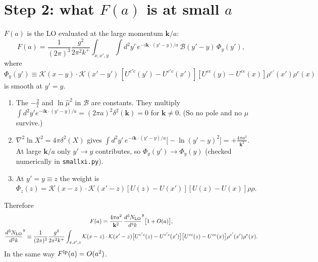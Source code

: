 \documentclass[10pt]{article}
\numberwithin{equation}{section}
\newcommand{\NLO}[1]{\frac{d^3N_{#1}}{d^3k}}
\begin{document}
\section{Step 2: what $F(a)$ is at small $a$}
$F(a)$ is the LO evaluated at the large momentum $\mathbf k/a$:
\begin{equation}
F(a)=\frac{1}{(2\pi)^3}\frac{g^2}{2\pi^2k^+}\int_{x,x',y}\int d^2y'\,e^{-i\mathbf k\cdot(y'-y)/a}\,\mathcal B(y'-y)\,\Phi_y(y'),
\end{equation}
where $\Phi_y(y')\equiv\mathcal K(x-y)\cdot\mathcal K(x'-y')\,[U^{e'c}(y')-U^{e'c}(x')][U^{ec}(y)-U^{ce}(x)]\rho^{e'}(x')\rho^e(x)$ is smooth at $y'=y$.
\begin{enumerate}
\item The $-\frac2\epsilon$ and $\ln\hat\mu^2$ in $\mathcal B$ are constants. They multiply $\int d^2y'e^{-i\mathbf k\cdot(y'-y)/a}=(2\pi a)^2\delta^2(\mathbf k)=0$ for $\mathbf k\ne0$. (So no pole and no $\mu$ survive.)
\item $\nabla^2\ln X^2=4\pi\delta^2(X)$ gives $\int d^2y'\,e^{-i\mathbf k\cdot(y'-y)/a}\big[-\ln(y'-y)^2\big]=+\frac{4\pi a^2}{\mathbf k^2}$. At large $\mathbf k/a$ only $y'\to y$ contributes, so $\Phi_y(y')\to\Phi_y(y)$ (checked numerically in \texttt{smallxi.py}).
\item At $y'=y\equiv z$ the weight is $\Phi_z(z)=\mathcal K(x-z)\cdot\mathcal K(x'-z)[U(z)-U(x')][U(z)-U(x)]\rho\rho$.
\end{enumerate}
Therefore
\begin{gather}
F(a)=\frac{4\pi a^2}{\mathbf k^2}\,\NLO{\rm LO}^{y}\big[1+O(a)\big],\\
\NLO{\rm LO}^{y}\equiv\frac{1}{(2\pi)^{3}}\frac{g^{2}}{2\pi^{2}k^{+}}\int_{x,x',z}\mathcal K(x-z)\cdot\mathcal K(x'-z)\big[U^{e'c}(z)-U^{e'c}(x')\big]\big[U^{ec}(z)-U^{ce}(x)\big]\rho^{e'}(x')\rho^{e}(x).
\end{gather}
In the same way $F^{\rm lp}(a)=O(a^2)$.
\end{document}
